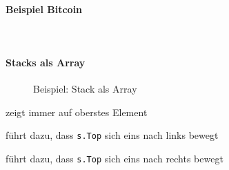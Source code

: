 \documentclass[
    ngerman,
    color=3b,
    load_common, %
    summary,
    boxarc,
]{tuda_summary}
\begin{document}
\paragraph{Beispiel Bitcoin}\mbox{}\\

\clearpage
\paragraph{Stacks als Array}\mbox{}
\begin{figure}[ht]
    \centering
    
    \caption{Beispiel: Stack als Array}
\end{figure}
\begin{description}[leftmargin=3cm,itemsep=1em]
    \item [\texttt{s.top}] zeigt immer auf oberstes Element
    \item [\texttt{pop()}] führt dazu, dass \texttt{s.Top} sich eins nach links bewegt
    \item [\texttt{push(k)}] führt dazu, dass \texttt{s.Top} sich eins nach rechts bewegt
\end{description}
\end{document}
